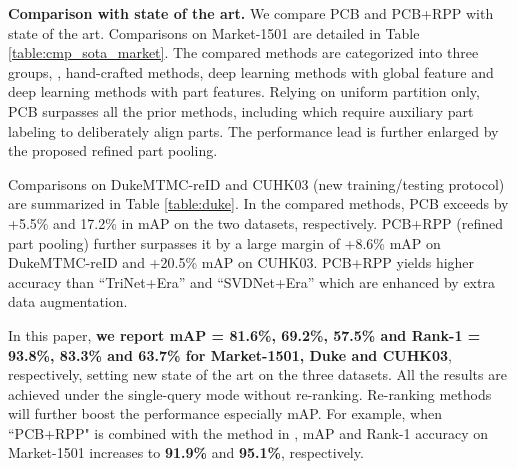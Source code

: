 \documentclass[10pt,twocolumn,letterpaper]{article}
\begin{document}
{{{\textbf{Comparison with state of the art.}
We compare PCB and PCB+RPP with state of the art. Comparisons on Market-1501 are detailed in Table \ref{table:cmp_sota_market}. The compared methods are categorized into three groups, \ie, hand-crafted methods, deep learning methods with global feature and deep learning methods with part features. Relying on uniform partition only, PCB surpasses all the prior methods, including \cite{Su2017Pose,Wei2017GLAD} which require auxiliary part labeling to deliberately align parts. The performance lead is further enlarged by the proposed refined part pooling. 

Comparisons on DukeMTMC-reID and CUHK03 (new training/testing protocol) are summarized in Table \ref{table:duke}. In the compared methods,  PCB exceeds \cite{ChenPerson_multiscale} by +5.5\% and 17.2\% in mAP on the two datasets, respectively. PCB+RPP (refined part pooling) further surpasses it by a large margin of +8.6\% mAP on DukeMTMC-reID and +20.5\% mAP on CUHK03. PCB+RPP yields higher accuracy than ``TriNet+Era'' and ``SVDNet+Era'' \cite{Zhong2017Random} which are enhanced by extra data augmentation. 

In this paper, \textbf{we report mAP = 81.6\%, 69.2\%, 57.5\% and Rank-1 = 93.8\%, 83.3\% and 63.7\% for Market-1501, Duke and CUHK03}, respectively, setting new state of the art on the three datasets. All the results are achieved under the single-query mode without re-ranking. Re-ranking methods will further boost the performance especially mAP. For example, when ``PCB+RPP" is combined with the method in \cite{DBLP:conf/cvpr/ZhongZCL17}, mAP and Rank-1 accuracy on Market-1501 increases to \textbf{91.9\%} and \textbf{95.1\%}, respectively.





}}}
\end{document}
